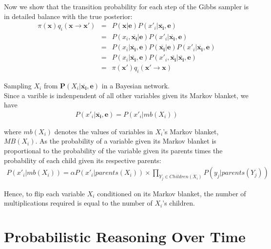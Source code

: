 \documentclass[12pt]{article}
\begin{document}
Now we show that the transition probability for each step of the Gibbs sampler is in detailed balance with the true posterior:
\begin{eqnarray*}
\pi(\boldsymbol{x}) q_i(\boldsymbol{x} \rightarrow \boldsymbol{x'})
&=& P(\boldsymbol{x}|\boldsymbol{e})
    P(x'_i| \overline{\boldsymbol{x_i}},\boldsymbol{e}) \\
&=& P(x_i, \overline{\boldsymbol{x_i}} | \boldsymbol{e})
    P(x'_i| \overline{\boldsymbol{x_i}},\boldsymbol{e}) \\
&=& P(x_i | \overline{\boldsymbol{x_i}}, \boldsymbol{e})
    P(\overline{\boldsymbol{x_i}} | \boldsymbol{e})
    P(x'_i | \overline{\boldsymbol{x_i}},\boldsymbol{e}) \\
&=& P(x_i | \overline{\boldsymbol{x_i}}, \boldsymbol{e})
    P(x'_i, \overline{\boldsymbol{x_i}} 
      | \overline{\boldsymbol{x_i}},\boldsymbol{e}) \\
&=& \pi(\boldsymbol{x'}) q_i(\boldsymbol{x'} \rightarrow \boldsymbol{x})
\end{eqnarray*}

Sampling $X_i$ from $\boldsymbol{P}(X_i | \overline{\boldsymbol{x_i}}, \boldsymbol{e})$ in a Bayesian network. \\

Since a varible is indenpendent of all other variables given its Markov blanket, we have
\begin{eqnarray*}
P(x'_i | \overline{\boldsymbol{x_i}}, \boldsymbol{e}) = P(x'_i | mb(X_i))
\end{eqnarray*}

where $mb(X_i)$ denotes the values of variables in $X_i$'s Markov blanket, $MB(X_i)$. As the probability of a variable given its Markov blanket is proportional to the probability of the variable given its parents times the probability of each child given its respective parents:
\begin{eqnarray*}
P(x'_i|mb(X_i))
= \alpha P(x'_i | parents(X_i)) \times
  \prod_{Y_j \in Children(X_i)} P(y_j | parents(Y_j))
\end{eqnarray*}

Hence, to flip each variable $X_i$ conditioned on its Markov blanket, the number of multiplications required is equal to the number of $X_i$'s children.

\section{Probabilistic Reasoning Over Time}
\end{document}
